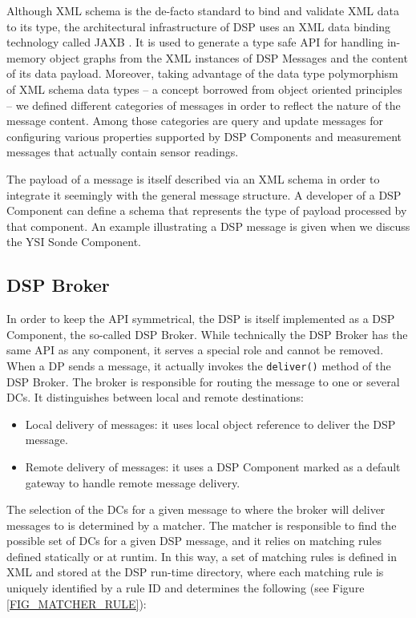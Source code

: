 \documentclass[conference]{IEEEtran}
\begin{document}
Although XML schema is the de-facto standard to bind and validate XML
data to its type, the architectural infrastructure of DSP uses an XML
data binding technology \cite{xml-dbind} called JAXB \cite{xml-jaxb}.
It is used to generate a type safe API for handling in-memory object
graphs from the XML instances of DSP Messages and the content of its
data payload. Moreover, taking advantage of the data type polymorphism
of XML schema data types -- a concept borrowed from object oriented
principles -- we defined different categories of messages in order to
reflect the nature of the message content. Among those categories are
query and update messages for configuring various properties supported
by DSP Components and measurement messages that actually contain
sensor readings.

The payload of a message is itself described via an XML schema in
order to integrate it seemingly with the general message structure. A
developer of a DSP Component can define a schema that represents the
type of payload processed by that component. An example illustrating a
DSP message is given when we discuss the YSI Sonde Component.

\subsection{DSP Broker}
\label{SEC_DSP_BROKER}

In order to keep the API symmetrical, the DSP is itself implemented as
a DSP Component, the so-called DSP Broker. While technically the DSP
Broker has the same API as any component, it serves a special role and
cannot be removed. When a DP sends a message, it actually
invokes the \texttt{deliver()} method of the DSP Broker. The broker is
responsible for routing the message to one or several DCs. It
distinguishes between local and remote destinations:

\begin{itemize}
\item Local delivery of messages: it uses local object reference to
  deliver the DSP message.
\item Remote delivery of messages: it uses a DSP Component marked as a
  default gateway to handle remote message delivery.
\end{itemize}

The selection of the DCs for a given message to where the broker will
deliver messages to is determined by a matcher.  The matcher is
responsible to find the possible set of DCs for a given DSP message,
and it relies on matching rules defined statically or at runtim. In
this way, a set of matching rules is defined in XML and stored at the
DSP run-time directory, where each matching rule is uniquely
identified by a rule ID and determines the following (see Figure
\ref{FIG_MATCHER_RULE}):
\end{document}
